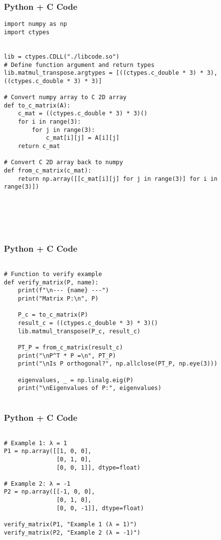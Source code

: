 \documentclass{beamer}
\begin{document}
\begin{frame}[fragile]
    \frametitle{Python + C Code}
    \begin{lstlisting}
import numpy as np
import ctypes


lib = ctypes.CDLL("./libcode.so")
# Define function argument and return types
lib.matmul_transpose.argtypes = [((ctypes.c_double * 3) * 3), ((ctypes.c_double * 3) * 3)]

# Convert numpy array to C 2D array
def to_c_matrix(A):
    c_mat = ((ctypes.c_double * 3) * 3)()
    for i in range(3):
        for j in range(3):
            c_mat[i][j] = A[i][j]
    return c_mat

# Convert C 2D array back to numpy
def from_c_matrix(c_mat):
    return np.array([[c_mat[i][j] for j in range(3)] for i in range(3)])






    \end{lstlisting}
\end{frame}
\begin{frame}[fragile]
    \frametitle{Python + C Code}
    \begin{lstlisting}

# Function to verify example
def verify_matrix(P, name):
    print(f"\n--- {name} ---")
    print("Matrix P:\n", P)

    P_c = to_c_matrix(P)
    result_c = ((ctypes.c_double * 3) * 3)()
    lib.matmul_transpose(P_c, result_c)

    PT_P = from_c_matrix(result_c)
    print("\nP^T * P =\n", PT_P)
    print("\nIs P orthogonal?", np.allclose(PT_P, np.eye(3)))

    eigenvalues, _ = np.linalg.eig(P)
    print("\nEigenvalues of P:", eigenvalues)


    \end{lstlisting}
\end{frame}
\begin{frame}[fragile]
    \frametitle{Python + C Code}
    \begin{lstlisting}

# Example 1: λ = 1
P1 = np.array([[1, 0, 0],
               [0, 1, 0],
               [0, 0, 1]], dtype=float)

# Example 2: λ = -1
P2 = np.array([[-1, 0, 0],
               [0, 1, 0],
               [0, 0, -1]], dtype=float)

verify_matrix(P1, "Example 1 (λ = 1)")
verify_matrix(P2, "Example 2 (λ = -1)")
    \end{lstlisting}
\end{frame}
\end{document}
